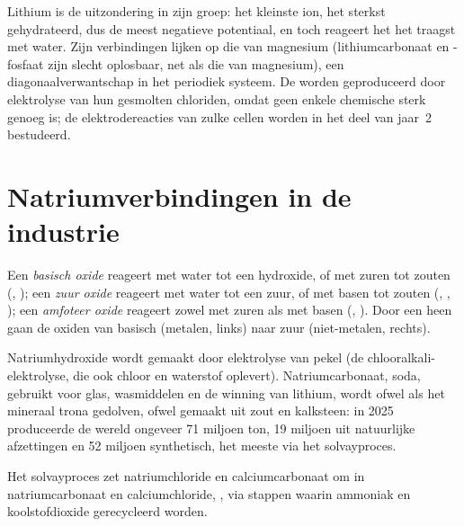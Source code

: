 Lithium is de uitzondering in zijn groep: het kleinste ion, het sterkst
gehydrateerd, dus de meest negatieve potentiaal, en toch reageert het het
traagst met water. Zijn verbindingen lijken op die van magnesium
(lithiumcarbonaat en -fosfaat zijn slecht oplosbaar, net als die van
magnesium), een diagonaalverwantschap in het periodiek systeem. De
 worden geproduceerd door elektrolyse van hun gesmolten
chloriden, omdat geen enkele chemische  sterk genoeg is; de
elektrodereacties van zulke cellen worden in het deel van jaar~2
bestudeerd.

\section{Natriumverbindingen in de industrie}

\begin{definition}\label{def:b1:s-block:oxide-character}
Een \emph{basisch oxide} reageert met water tot een
hydroxide, of met zuren tot zouten (, ); een \emph{zuur
oxide} reageert met water tot een zuur, of met basen
tot zouten (, , ); een \emph{amfoteer
oxide} reageert zowel met zuren als met basen
(, ). Door een  heen gaan de oxiden van basisch
(metalen, links) naar zuur (niet-metalen, rechts).
\end{definition}

Natriumhydroxide wordt gemaakt door elektrolyse van pekel (de
chlooralkali-elektrolyse, die ook chloor en waterstof oplevert).
Natriumcarbonaat, soda, gebruikt voor glas, wasmiddelen en de winning van
lithium, wordt ofwel als het mineraal trona gedolven, ofwel gemaakt uit
zout en kalksteen: in 2025 produceerde de wereld ongeveer 71 miljoen ton,
19 miljoen uit natuurlijke afzettingen en 52 miljoen synthetisch, het
meeste via het solvayproces.

\begin{proposition}\label{prop:b1:s-block:solvay}
Het solvayproces zet natriumchloride en calciumcarbonaat om in
natriumcarbonaat en calciumchloride, , via stappen waarin ammoniak en koolstofdioxide gerecycleerd
worden.
\end{proposition}

